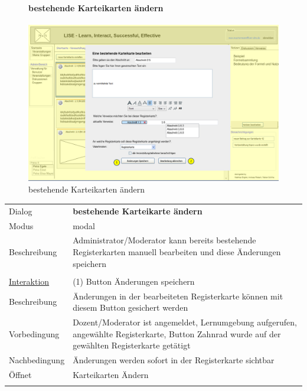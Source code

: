 \documentclass[12pt,a4paper]{article}
\begin{document}
{\begin{figure}[H]
	\centering
	\paragraph{bestehende Karteikarten ändern}
	\includegraphics[width=\textwidth]{Bilder/Mockups/GUI/BestehendeKarteikarteBearbeiten[ModeratorAdmin].png}
	\caption{bestehende Karteikarten ändern}
	\label{GuibestehendeKarteikartenAendern}
\end{figure}

\begin{tabular}{l p{12cm}}
Dialog 	 		 & \textbf{bestehende Karteikarte ändern} \\ 
Modus 			 & modal\\ 
Beschreibung   	 & Administrator/Moderator kann bereits bestehende Registerkarten manuell bearbeiten und diese Änderungen speichern\\\\

\underline{Interaktion} & (1) Button Änderungen speichern \\ 
Beschreibung   	 		& Änderungen in der bearbeiteten Registerkarte können mit diesem Button gesichert werden\\
Vorbedingung	 		& Dozent/Moderator ist angemeldet, Lernumgebung aufgerufen, angewählte Registerkarte, Button Zahnrad wurde auf der gewählten Registerkarte getätigt\\
Nachbedingung	 		& Änderungen werden sofort in der Registerkarte sichtbar\\
Öffnet			 		& \glqq Karteikarten Ändern\grqq \\\\
\end{tabular}

}
\end{document}
